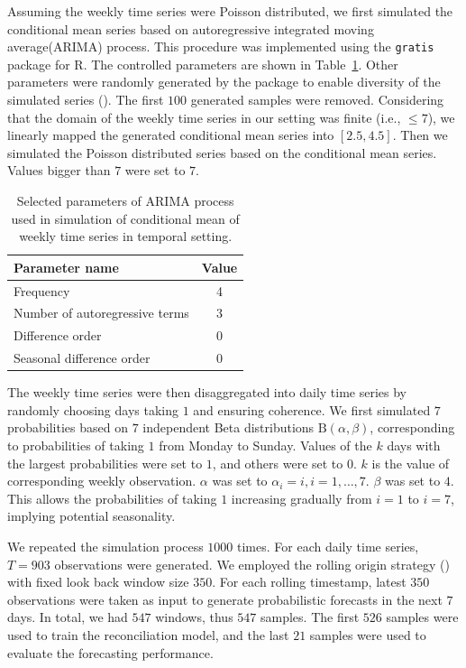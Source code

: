 \documentclass[a4paper,review,12pt,authoryear]{elsarticle}
\let\code=\texttt
\let\proglang=\textsf
\begin{document}
Assuming the weekly time series were Poisson distributed, we first simulated the conditional mean series based on autoregressive integrated moving average(ARIMA)  process. This procedure was implemented using the \code{gratis} package for \proglang{R}. 
The controlled parameters are shown in Table~\ref{tab:parameters}. Other parameters were randomly generated by the package to enable diversity of the simulated series (). 
The first $100$ generated samples were removed.
Considering that the domain of the weekly time series in our setting was finite (i.e., $\leq 7$), we linearly mapped the generated conditional mean series into $[2.5, 4.5]$. 
Then we simulated the Poisson distributed series based on the conditional mean series. Values bigger than $7$ were set to $7$.

\begin{table}[h]
  \centering
  \caption{\label{tab:parameters} Selected parameters of ARIMA process used in simulation of conditional mean of weekly time series in temporal setting.}
  \begin{tabular}{lc}
    \toprule
    Parameter name & Value \\ \midrule
    Frequency & 4 \\
    Number of autoregressive terms & 3 \\
    Difference order & 0 \\
    Seasonal difference order & 0 \\ \bottomrule
  \end{tabular}
\end{table}

The weekly time series were then disaggregated into daily time series by randomly choosing days taking $1$ and ensuring coherence. 
We first simulated $7$ probabilities based on $7$ independent Beta distributions $\textrm{B}(\alpha, \beta)$, corresponding to probabilities of taking $1$ from Monday to Sunday. 
Values of the $k$ days with the largest probabilities were set to $1$, and others were set to $0$. $k$ is the value of corresponding weekly observation.
$\alpha$ was set to $\alpha_i = i, i=1,\dots,7$. $\beta$ was set to $4$. This allows the probabilities of taking $1$ increasing gradually from $i=1$ to $i=7$, implying potential seasonality.

We repeated the simulation process $1000$ times. For each daily time series, $T=903$ observations were generated. We employed the rolling origin strategy () with fixed look back window size $350$. 
For each rolling timestamp, latest $350$ observations were taken as input to generate probabilistic forecasts in the next $7$ days. 
In total, we had $547$ windows, thus $547$ samples.
The first $526$ samples were used to train the reconciliation model, and the last $21$ samples were used to evaluate the forecasting performance.
\end{document}

